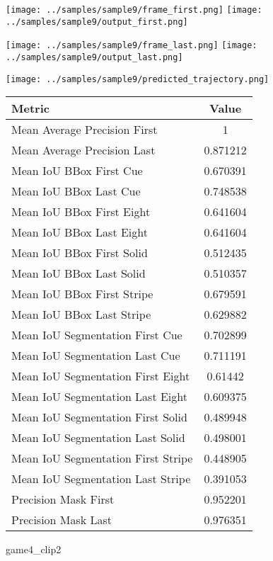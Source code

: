 \begin{figure}
\texttt{[image: ../samples/sample9/frame\_first.png]}
\texttt{[image: ../samples/sample9/output\_first.png]}\par
\texttt{[image: ../samples/sample9/frame\_last.png]}
\texttt{[image: ../samples/sample9/output\_last.png]}\par
\centering
\texttt{[image: ../samples/sample9/predicted\_trajectory.png]}
\caption{game4\_clip2}
\vspace{10pt}
\begin{tabular}{|l|c|}
\hline
\textbf{Metric} & \textbf{Value} \\
\hline
Mean Average Precision First & 1 \\
Mean Average Precision Last & 0.871212 \\
\hline
Mean IoU BBox First Cue & 0.670391 \\
Mean IoU BBox Last Cue & 0.748538 \\
Mean IoU BBox First Eight & 0.641604 \\
Mean IoU BBox Last Eight & 0.641604 \\
Mean IoU BBox First Solid & 0.512435 \\
Mean IoU BBox Last Solid & 0.510357 \\
Mean IoU BBox First Stripe & 0.679591 \\
Mean IoU BBox Last Stripe & 0.629882 \\
\hline
Mean IoU Segmentation First Cue & 0.702899 \\
Mean IoU Segmentation Last Cue & 0.711191 \\
Mean IoU Segmentation First Eight & 0.61442 \\
Mean IoU Segmentation Last Eight & 0.609375 \\
Mean IoU Segmentation First Solid & 0.489948 \\
Mean IoU Segmentation Last Solid & 0.498001 \\
Mean IoU Segmentation First Stripe & 0.448905 \\
Mean IoU Segmentation Last Stripe & 0.391053 \\
\hline
Precision Mask First & 0.952201 \\
Precision Mask Last & 0.976351 \\
\hline
\end{tabular}
\end{figure}
